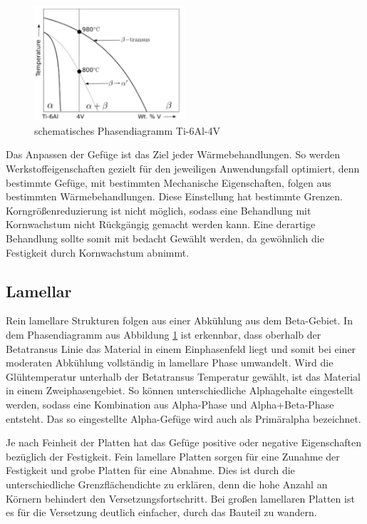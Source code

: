\documentclass[a4paper, 11pt]{tubsreprt}
\begin{document}
\begin{figure}
	\centering
	\includegraphics[width=0.5\textwidth]{Bilder/Phasendiagram.PNG}
	\caption[Phasendiagramm]{schematisches Phasendiagramm Ti-6Al-4V \cite{Babu2008}}
	\label{Phasendiagram}
\end{figure}
Das Anpassen der Gefüge ist das Ziel jeder Wärmebehandlungen. So werden Werkstoffeigenschaften gezielt für den jeweiligen Anwendungsfall optimiert, denn bestimmte Gefüge, mit bestimmten Mechanische Eigenschaften, folgen aus bestimmten Wärmebehandlungen. Diese Einstellung hat bestimmte Grenzen. Korngrößenreduzierung ist nicht möglich, sodass eine Behandlung mit Kornwachstum nicht Rückgängig gemacht werden kann. Eine derartige Behandlung sollte somit mit bedacht Gewählt werden, da gewöhnlich die Festigkeit durch Kornwachstum abnimmt.
\subsection{Lamellar}
Rein lamellare Strukturen folgen aus einer Abkühlung aus dem Beta-Gebiet. In dem Phasendiagramm aus Abbildung \ref{Phasendiagram} ist erkennbar, dass oberhalb der Betatransus Linie das Material in einem Einphasenfeld liegt und somit bei einer moderaten Abkühlung vollständig in lamellare Phase umwandelt. Wird die Glühtemperatur unterhalb der Betatransus Temperatur gewählt, ist das Material in einem Zweiphasengebiet. So können unterschiedliche Alphagehalte eingestellt werden, sodass eine Kombination aus Alpha-Phase und Alpha+Beta-Phase entsteht. Das so eingestellte Alpha-Gefüge wird auch als Primäralpha bezeichnet. 


Je nach Feinheit der Platten hat das Gefüge positive oder negative Eigenschaften bezüglich der Festigkeit. Fein lamellare Platten sorgen für eine Zunahme der Festigkeit und grobe Platten für eine Abnahme. Dies ist durch die unterschiedliche Grenzflächendichte zu erklären, denn die hohe Anzahl an Körnern behindert den Versetzungsfortschritt. Bei großen lamellaren Platten ist es für die Versetzung deutlich einfacher, durch das Bauteil zu wandern. 
\end{document}
